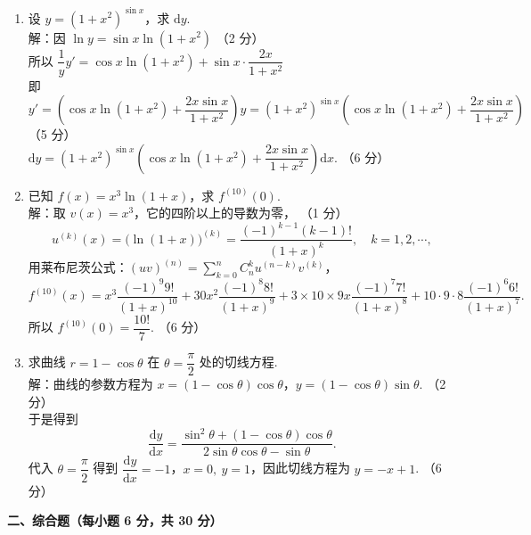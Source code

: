 \documentclass[a4paper,11pt]{ctexart}
\newcommand{\dd}{\mathrm{d}}
\newcommand{\score}[1]{\hfill（#1）}
\begin{document}
\begin{enumerate}[label=\arabic*., leftmargin=2em, itemsep=1.0em, topsep=0.5em]
  \item 设 $y = (1+x^2)^{\sin x}$，求 $\dd y$.\\[0.3em]
  解：因 $\ln y = \sin x \ln(1+x^2)$ \score{2 分}\\[0.2em]
  所以 $\dfrac{1}{y}y' = \cos x\ln(1+x^2) + \sin x\cdot\dfrac{2x}{1+x^2}$\\[0.2em]
  即 $y' = \left(\cos x\ln(1+x^2) + \dfrac{2x\sin x}{1+x^2}\right)y = (1+x^2)^{\sin x}\left(\cos x\ln(1+x^2) + \dfrac{2x\sin x}{1+x^2}\right)$ \score{5 分}\\[0.3em]
  $\dd y = (1+x^2)^{\sin x}\left(\cos x\ln(1+x^2) + \dfrac{2x\sin x}{1+x^2}\right)\dd x$. \score{6 分}

  \item 已知 $f(x) = x^3 \ln(1+x)$，求 $f^{(10)}(0)$.\\[0.3em]
  解：取 $v(x) = x^3$，它的四阶以上的导数为零， \score{1 分}
  \[
    u^{(k)}(x) = \bigl(\ln(1+x)\bigr)^{(k)} = \frac{(-1)^{k-1}(k-1)!}{(1+x)^k},\quad k = 1, 2, \cdots, \tag*{（3 分）}
  \]
  用莱布尼茨公式：$(uv)^{(n)} = \sum\limits_{k=0}^{n} C_n^k u^{(n-k)} v^{(k)}$，
  \[
    f^{(10)}(x) = x^3\frac{(-1)^9 9!}{(1+x)^{10}} + 30x^2\frac{(-1)^8 8!}{(1+x)^9} + 3\times 10\times 9x\frac{(-1)^7 7!}{(1+x)^8} + 10\cdot 9\cdot 8\frac{(-1)^6 6!}{(1+x)^7}.
  \]
  所以 $f^{(10)}(0) = \dfrac{10!}{7}$. \score{6 分}

  \item 求曲线 $r = 1 - \cos\theta$ 在 $\theta = \dfrac{\pi}{2}$ 处的切线方程.\\[0.3em]
  解：曲线的参数方程为 $x = (1 - \cos\theta)\cos\theta$，$y = (1 - \cos\theta)\sin\theta$. \score{2 分}\\[0.2em]
  于是得到
  \[
    \frac{\dd y}{\dd x} = \frac{\sin^2\theta + (1 - \cos\theta)\cos\theta}{2\sin\theta\cos\theta - \sin\theta}. \tag*{（4 分）}
  \]
  代入 $\theta = \dfrac{\pi}{2}$ 得到 $\dfrac{\dd y}{\dd x} = -1$，$x = 0,\ y = 1$，因此切线方程为 $y = -x + 1$. \score{6 分}
\end{enumerate}

\vspace{0.8em}

\textbf{二、综合题（每小题 6 分，共 30 分）}
\end{document}
